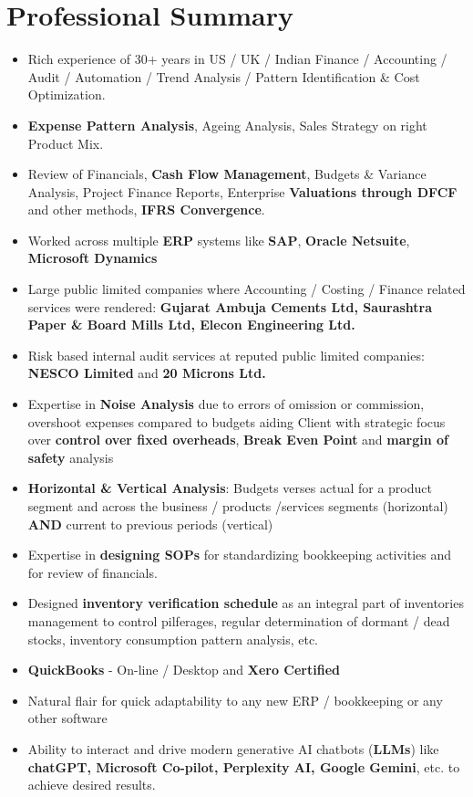 \documentclass[a4paper,11pt]{article}
\newcommand{\resumeItemListStart}{\begin{justify}\begin{itemize}[leftmargin=*, rightmargin=2ex, noitemsep,labelsep=1.2mm,itemsep=2mm,label={\textbullet}]\vspace{2mm}\large}
\newcommand{\resumeItemListEnd}
{\end{itemize}\end{justify}\vspace{2mm}}
\begin{document}
\section{\textbf{\Large{Professional Summary}}}
\resumeItemListStart
\item {Rich experience of 30+ years in US / UK / Indian Finance / Accounting / Audit / Automation / Trend Analysis / Pattern Identification \& Cost Optimization.}
\item {\textbf{Expense Pattern Analysis}, Ageing Analysis, Sales Strategy on right Product Mix.}
\item {Review of Financials, \textbf{Cash Flow Management}, Budgets \& Variance Analysis, Project Finance Reports, Enterprise \textbf{Valuations through DFCF} and other methods, \textbf{IFRS Convergence}.}
\item {Worked across multiple \textbf{ERP} systems like \textbf{SAP}, \textbf{Oracle Netsuite}, \textbf{Microsoft Dynamics}}
\item {Large public limited companies where Accounting / Costing / Finance related services were rendered: \textbf{Gujarat Ambuja Cements Ltd, Saurashtra Paper \& Board Mills Ltd, Elecon Engineering Ltd.}}
\item {Risk based internal audit services at reputed public limited companies: \textbf{NESCO Limited} and  \textbf{20 Microns Ltd.}}
\item {Expertise in \textbf{Noise Analysis} due to errors of omission or commission, overshoot expenses compared to budgets aiding Client with strategic focus over \textbf{control over fixed overheads}, \textbf{Break Even Point} and \textbf{margin of safety} analysis}
\item {\textbf{Horizontal \& Vertical Analysis}: Budgets verses actual for a product segment and across the business / products /services segments (horizontal) \textbf{AND} current to previous periods (vertical)}
\item {Expertise in \textbf{designing SOPs} for standardizing bookkeeping activities and for review of financials.}
\item {Designed \textbf{inventory verification schedule} as an integral part of inventories management to control pilferages, regular determination of dormant / dead stocks, inventory consumption pattern analysis, etc.}
\item {\textbf{QuickBooks} - On-line / Desktop and \textbf{Xero Certified}}
\item {Natural flair for quick adaptability to any new ERP / bookkeeping or any other software}
\item {Ability to interact and drive modern generative AI chatbots (\textbf{LLMs}) like \textbf{chatGPT, Microsoft Co-pilot, Perplexity AI, Google Gemini}, etc. to achieve desired results.}
\resumeItemListEnd
\vspace{-3.0mm}
\end{document}
